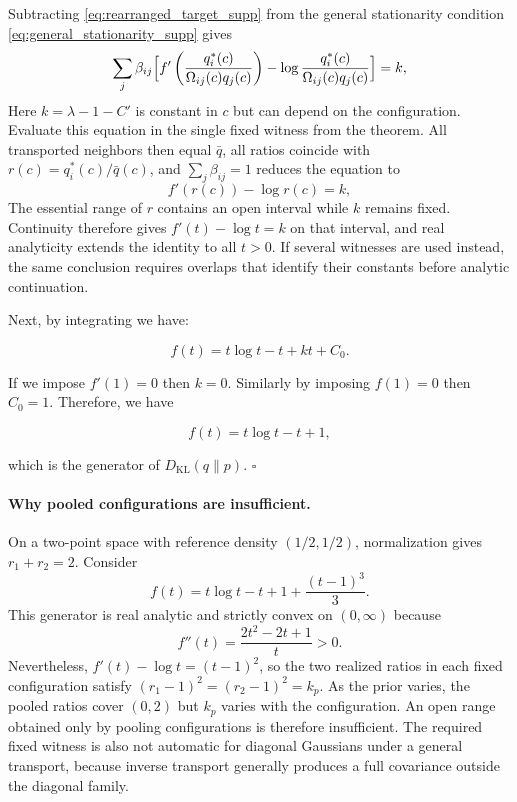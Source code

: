 \documentclass[twoside,11pt]{article}
\begin{document}
Subtracting \eqref{eq:rearranged_target_supp} from the general stationarity condition \eqref{eq:general_stationarity_supp} gives
\begin{equation}
\sum_{j} \beta_{ij}\Bigl[ f'\left(\frac{q_i^*(c)}{\Omega_{ij}(c)q_j(c)}\right) - \log\frac{q_i^*(c)}{\Omega_{ij}(c)q_j(c)}\Bigr] = k,
\label{eq:residual_sum_supp}
\end{equation}
Here $k=\lambda-1-C'$ is constant in $c$ but can depend on the configuration. Evaluate this equation in the single fixed witness from the theorem. All transported neighbors then equal $\bar q$, all ratios coincide with $r(c)=q_i^*(c)/\bar q(c)$, and $\sum_j\beta_{ij}=1$ reduces the equation to
\begin{equation}
f'(r(c)) - \log r(c) = k,
\label{eq:ode_supp}
\end{equation}
The essential range of $r$ contains an open interval while $k$ remains fixed. Continuity therefore gives $f'(t)-\log t=k$ on that interval, and real analyticity extends the identity to all $t>0$. If several witnesses are used instead, the same conclusion requires overlaps that identify their constants before analytic continuation.

Next, by integrating we have:

\[
f(t) = t\log t - t + kt + C_0.
\]

If we impose $f'(1)=0$ then $k=0$. Similarly by imposing $f(1)=0$ then $C_0 = 1$. Therefore, we have

\[
f(t) = t\log t - t + 1,
\]

which is the generator of $D_{\mathrm{KL}}(q \| p)$. \hfill $\square$

\paragraph{Why pooled configurations are insufficient.}
On a two-point space with reference density $(1/2,1/2)$, normalization gives $r_1+r_2=2$. Consider
\begin{equation}
f(t)=t\log t-t+1+\frac{(t-1)^3}{3}.
\end{equation}
This generator is real analytic and strictly convex on $(0,\infty)$ because
\begin{equation}
f''(t)=\frac{2t^2-2t+1}{t}>0.
\end{equation}
Nevertheless, $f'(t)-\log t=(t-1)^2$, so the two realized ratios in each fixed configuration satisfy $(r_1-1)^2=(r_2-1)^2=k_p$. As the prior varies, the pooled ratios cover $(0,2)$ but $k_p$ varies with the configuration. An open range obtained only by pooling configurations is therefore insufficient. The required fixed witness is also not automatic for diagonal Gaussians under a general transport, because inverse transport generally produces a full covariance outside the diagonal family.
\end{document}

